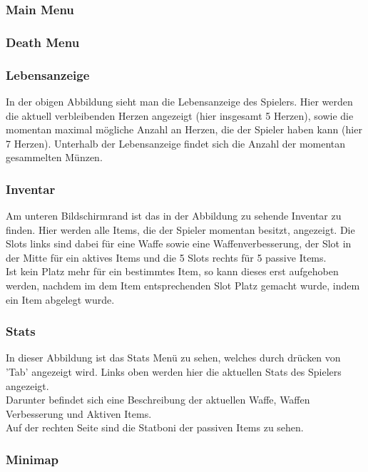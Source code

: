 \subsubsection{Main Menu}

\subsubsection{Death Menu}

\subsubsection{Lebensanzeige}
In der obigen Abbildung sieht man die Lebensanzeige des Spielers. Hier werden die aktuell verbleibenden Herzen angezeigt (hier insgesamt 5 Herzen), sowie die momentan maximal mögliche Anzahl an Herzen, die der Spieler haben kann (hier 7 Herzen). Unterhalb der Lebensanzeige findet sich die Anzahl der momentan gesammelten Münzen.

\subsubsection{Inventar}
Am unteren Bildschirmrand ist das in der Abbildung zu sehende Inventar zu finden. Hier werden alle Items, die der Spieler momentan besitzt, angezeigt. Die Slots links sind dabei für eine Waffe sowie eine Waffenverbesserung, der Slot in der Mitte für ein aktives Items und die 5 Slots rechts für 5 passive Items. \\
Ist kein Platz mehr für ein bestimmtes Item, so kann dieses erst aufgehoben werden, nachdem im dem Item entsprechenden Slot Platz gemacht wurde, indem ein Item abgelegt wurde.

\subsubsection{Stats}
In dieser Abbildung ist das Stats Menü zu sehen, welches durch drücken von 'Tab' angezeigt wird. Links oben werden hier die aktuellen Stats des Spielers angezeigt.\\
Darunter befindet sich eine Beschreibung der aktuellen Waffe, Waffen Verbesserung und Aktiven Items.\\
Auf der rechten Seite sind die Statboni der passiven Items zu sehen.

\subsubsection{Minimap}

